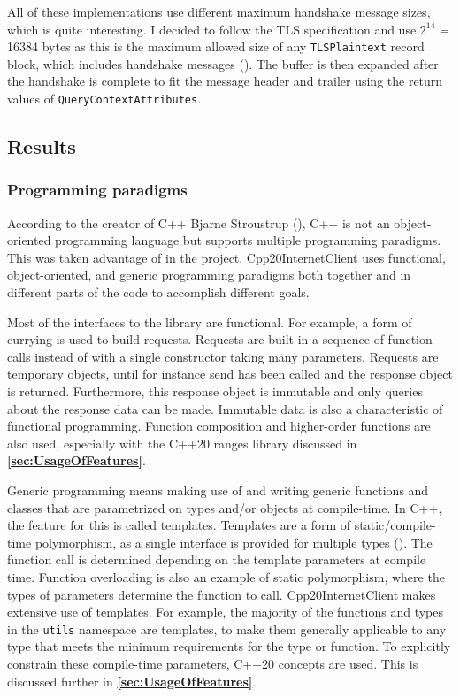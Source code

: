 \documentclass[12pt, a4paper]{article}
\begin{document}
All of these implementations use different maximum handshake message sizes, which is quite interesting. I decided to follow the TLS specification and use $2^{14}$ = 16384 bytes as this is the maximum allowed size of any \texttt{TLSPlaintext} record block, which includes handshake messages (\cite{TlsSpec}). The buffer is then expanded after the handshake is complete to fit the message header and trailer using the return values of \texttt{QueryContextAttributes}.
\subsection{Results}\label{sec:Results}
\subsubsection{Programming paradigms}
According to the creator of C++ Bjarne Stroustrup (\citeyear{CppNotJustObjectOriented}), C++ is not an object-oriented programming language but supports multiple programming paradigms. This was taken advantage of in the project. Cpp20InternetClient uses functional, object-oriented, and generic programming paradigms both together and in different parts of the code to accomplish different goals. 

Most of the interfaces to the library are functional. For example, a form of currying is used to build requests. Requests are built in a sequence of function calls instead of with a single constructor taking many parameters. Requests are temporary objects, until for instance send has been called and the response object is returned. Furthermore, this response object is immutable and only queries about the response data can be made. Immutable data is also a characteristic of functional programming. Function composition and higher-order functions are also used, especially with the C++20 ranges library discussed in \textbf{\ref{sec:UsageOfFeatures}}.

Generic programming means making use of and writing generic functions and classes that are parametrized on types and/or objects at compile-time. In C++, the feature for this is called templates. Templates are a form of static/compile-time polymorphism, as a single interface is provided for multiple types (\cite{StaticPolymorphism}). The function call is determined depending on the template parameters at compile time. Function overloading is also an example of static polymorphism, where the types of parameters determine the function to call. Cpp20InternetClient makes extensive use of templates. For example, the majority of the functions and types in the \texttt{utils} namespace are templates, to make them generally applicable to any type that meets the minimum requirements for the type or function. To explicitly constrain these compile-time parameters, C++20 concepts are used. This is discussed further in \textbf{\ref{sec:UsageOfFeatures}}.
\end{document}
